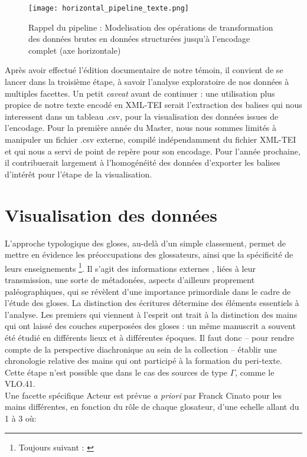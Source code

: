 \documentclass[a4paper, twoside, 12pt]{book}
\begin{document}
\begin{figure}[H]
    \centering
    \texttt{[image: horizontal\_pipeline\_texte.png]}
    \caption{ Rappel du pipeline  : Modelisation des opérations de transformation des données brutes en données structurées jusqu'à l'encodage complet (axe horizontale)}
\end{figure}


Après avoir effectué l'édition documentaire de notre témoin, il convient de se lancer dans la troisième étape, à savoir l'analyse exploratoire de nos données à multiples facettes. Un petit \textit{caveat} avant de continuer : une utilisation plus propice de notre texte encodé en XML-TEI serait l'extraction des balises qui nous interessent dans un tableau .csv, pour la visualisation des données issues de l'encodage. Pour la première année du Master, nous nous sommes limités à manipuler un fichier .csv externe, compilé indépendamment du fichier XML-TEI et qui nous a servi de point de repère pour son encodage. Pour l'année prochaine, il contribuerait largement à l'homogénéité des données d'exporter les balises d'intérêt pour l'étape de la visualisation.


\section{Visualisation des données}


L’approche typologique des gloses, au-delà d’un simple classement, permet de mettre en évidence les préoccupations des glossateurs, ainsi que la spécificité de leurs enseignements \footnote{Toujours suivant : \cite{cinato2011perspectives}}. Il s’agit des informations \og{} externes \fg{}, liées à leur transmission, une sorte de métadonées, aspects d'ailleurs proprement paléographiques, qui se révèlent d’une importance primordiale dans le cadre de l’étude des gloses. La distinction des écritures détermine des éléments essentiels à l’analyse. Les premiers qui viennent à l’esprit ont trait à la distinction des mains qui ont laissé des couches superposées des gloses : un même manuscrit a souvent été étudié en différents lieux et à différentes époques. Il faut donc – pour rendre compte de la perspective diachronique au sein de la collection – établir une chronologie relative des mains qui ont participé à la formation du peri-texte. Cette étape n’est possible que dans le cas des sources de type $\Gamma$, comme le VLO.41. \\

Une facette spécifique \og{} Acteur \fg{} est prévue \textit{a priori} par Franck Cinato pour les mains différentes, en fonction du rôle de chaque glosateur, d'une echelle allant du 1 à 3 où:
\end{document}
